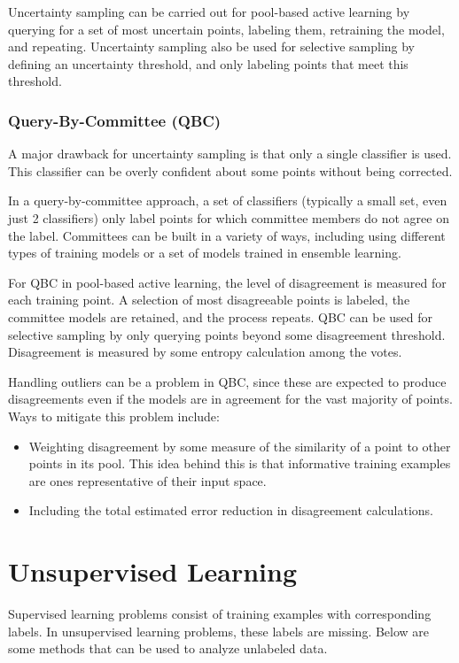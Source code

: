 \documentclass[12pt,titlepage]{article}
\let\stdsection\section
\renewcommand\section{\clearpage\stdsection}
\begin{document}
        Uncertainty sampling can be carried out for pool-based active learning by querying for a set of most uncertain points, labeling them, retraining
        the model, and repeating. Uncertainty sampling also be used for selective sampling by defining an uncertainty threshold, and only labeling points
        that meet this threshold.

      \subsubsection{Query-By-Committee (QBC)}
        A major drawback for uncertainty sampling is that only a single classifier is used. This classifier can be overly confident about some points without
        being corrected.

        In a query-by-committee approach, a set of classifiers (typically a small set, even just 2 classifiers) only label points for which committee members do
        not agree on the label. Committees can be built in a variety of ways, including using different types of training models or a set of models trained in
        ensemble learning.

        For QBC in pool-based active learning, the level of disagreement is measured for each training point. A selection of most disagreeable points is labeled,
        the committee models are retained, and the process repeats. QBC can be used for selective sampling by only querying points beyond some disagreement
        threshold. Disagreement is measured by some entropy calculation among the votes.

        Handling outliers can be a problem in QBC, since these are expected to produce disagreements even if the models are in agreement for the vast majority
        of points. Ways to mitigate this problem include:
        \begin{itemize}
          \item Weighting disagreement by some measure of the similarity of a point to other points in its pool. This idea behind this is that informative
            training examples are ones representative of their input space. 
          \item Including the total estimated error reduction in disagreement calculations.
        \end{itemize}

  \section{Unsupervised Learning}
    Supervised learning problems consist of training examples with corresponding labels. In unsupervised learning problems, these labels are missing.
    Below are some methods that can be used to analyze unlabeled data.
\end{document}
